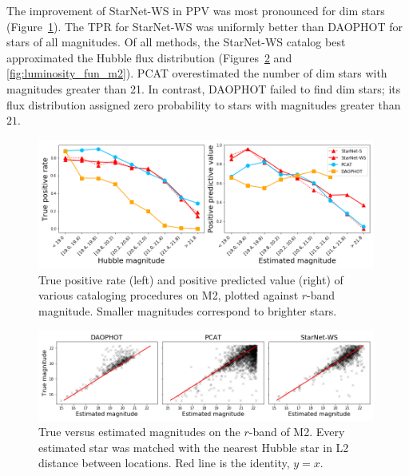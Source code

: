 

The improvement of StarNet-WS in PPV was most pronounced for dim stars (Figure~\ref{fig:summary_stats}). The TPR for StarNet-WS was uniformly better than DAOPHOT for stars of all magnitudes. 
Of all methods, the StarNet-WS catalog best approximated the Hubble flux distribution (Figures~\ref{fig:m2_flux_estimation} and \ref{fig:luminosity_fun_m2}). 
PCAT overestimated the number of dim stars with magnitudes greater than 21. 
In contrast, DAOPHOT failed to find dim stars; its flux distribution assigned zero probability to stars with magnitudes greater than $21$.

\begin{figure}[tb]
    \centering
    \includegraphics[width=0.99\textwidth]{figures/m2_results/summary_statistics_m2.png}
    \caption{True positive rate (left) and positive predicted value (right) of various cataloging
    procedures on M2, plotted against $r$-band magnitude.
    Smaller magnitudes correspond to brighter stars.
    }
    \label{fig:summary_stats}
\end{figure}

\begin{figure}[tb]
    \centering
    \includegraphics[width=0.99\textwidth]{figures/m2_results/m2_flux_estimation.png}
    \caption{True versus estimated magnitudes on the $r$-band of M2. 
    Every estimated star was matched with the nearest Hubble star in L2 distance between locations. 
    Red line is the identity, $y=x$. }
    \label{fig:m2_flux_estimation}
\end{figure}

